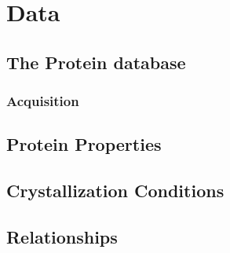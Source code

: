 \chapter{Data} %

\label{chapter/introduction} 

\section{The Protein database}\label{sec:protein_database}
\subsection{Acquisition}\label{sec:protein_database/acquisition}

\section{Protein Properties}\label{sec:protein_properties}

\section{Crystallization Conditions}\label{sec:crystallization_conditions}

\section{Relationships}\label{sec:relation_ships}